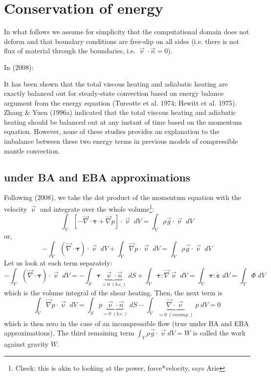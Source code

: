 \documentclass[a4paper,11pt]{article}
\begin{document}
\newpage
\section{Conservation of energy }

In what follows we assume for simplicity that the computational domain does not 
deform and that boundary conditions are free-slip on all sides (i.e.
there is not flux of material through the boundaries, i.e. $\vec\upnu\cdot \vec{n}=0$).

In \cite{lezh08} (2008):
\begin{displayquote}
{\color{darkgray}
It has been shown that the total viscous heating and adiabatic heating are exactly 
balanced out for steady-state convection based on energy
balance argument from the energy equation (Turcotte et al. 1974; Hewitt et al. 1975). 
Zhang \& Yuen (1996a) indicated that the total viscous
heating and adiabatic heating should be balanced out at any instant of time based on 
the momentum equation. However, none of these studies
provides an explanation to the imbalance between these two energy terms in previous models 
of compressible mantle convection.
}
\end{displayquote}

\subsection{under BA and EBA approximations}

Following \cite{lezh08} (2008), we take the dot product of the momentum 
equation with the velocity $\vec{\upnu}$ and integrate over the whole 
volume\footnote{Check: this is akin to looking at the power, force*velocity,  says Arie}:
\[
\int_V \left[ -\vec\nabla \cdot {\bm \tau}  + \vec{\nabla} p \right] \cdot \vec{\upnu} \; dV  
= \int_V  \rho \vec{g} \cdot \vec{\upnu} \; dV
\]
or, 
\[
-\int_V (\vec\nabla \cdot {\bm \tau})\cdot \vec{\upnu} \; dV 
+\int_V \vec{\nabla} p \cdot \vec{\upnu} \; dV  
= \int_V  \rho \vec{g} \cdot \vec{\upnu} \; dV
\]
Let us look at each term separately:
\[
-\int_V (\vec\nabla \cdot {\bm \tau})\cdot \vec{\upnu} \; dV 
=-\int_S {\bm \tau} \underbrace{\vec{\upnu}\cdot \vec{n}}_{=0 \; (b.c.)} \; dS 
+ \int_V {\bm \tau}:\vec{\nabla} \vec{\upnu} \; dV 
= \int_V {\bm \tau}:\dot{\bm \varepsilon} \; dV 
= \int_V \Phi \; dV 
\]
which is the volume integral of the shear heating. Then, the next term is
\[
\int_V \vec{\nabla} p \cdot \vec{\upnu} \; dV  =
\int_S p \underbrace{ \vec{\upnu}\cdot \vec{n}}_{=0 \; (b.c.)} \; dS 
- \int_V \underbrace{ \vec{\nabla}\cdot \vec{\upnu}}_{=0 \; (incomp.)} \; p \; dV = 0 
\]
which is then zero in the case of an incompressible flow (true under BA and EBA approximations). 
The third remaining term $\int_V \rho \vec{g} \cdot \vec{\upnu} dV = W$ 
is called the work against gravity $W$. 
\end{document}
